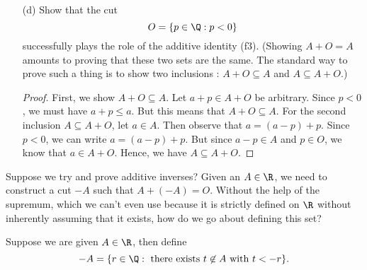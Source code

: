 \begin{enumerate}
\begin{proof}
        \end{proof}
    \item[(d)] Show that the cut 
        \[  O = \{ p \in \Q : p < 0  \}  \] successfully plays the role of the additive identity (f3). (Showing \( A + O = A  \) amounts to proving that these two sets are the same. The standard way to prove such a thing is to show two inclusions : \( A  + O \subseteq A  \) and \( A \subseteq A + O  \).) 
        \begin{proof}
        First, we show \( A + O \subseteq A  \). Let \( a + p \in  A+ O  \) be arbitrary. Since \(  p < 0  \), we must have \(  a + p \leq a  \). But this means that \( A + O \subseteq A  \). For the second inclusion \( A \subseteq A + O  \), let \( a \in A  \). Then observe that \( a = (a-p) + p \). Since \( p < 0  \), we can write \(  a = (a-p) + p  \). But since \( a - p \in A  \) and \( p \in O  \), we know that \( a \in A + O  \). Hence, we have \( A \subseteq A + O  \).        
        \end{proof}
\end{enumerate}

Suppose we try and prove additive inverses? Given an \( A \in \R  \), we need to construct a cut \( -A  \) such that \( A + (-A ) = O \). Without the help of the supremum, which we can't even use because it is strictly defined on \( \R  \) without inherently assuming that it exists, how do we go about defining this set? 

Suppose we are given \( A \in \R  \), then define
\[  -A = \{ r \in \Q:  \ \text{there exists } t  \not\in A \ \text{with} \ t < -r \}. \]

